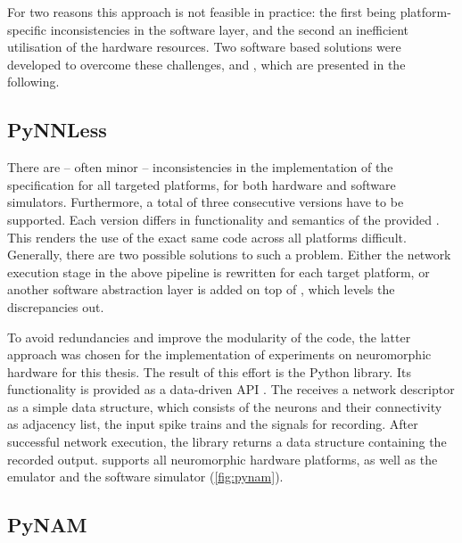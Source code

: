 For two reasons this approach is not feasible in practice: the first being platform-specific inconsistencies in the \PyNN software layer, and the second an inefficient utilisation of the hardware resources. Two software based solutions were developed to overcome these challenges, \PyNNLess and \PyNAM, which are presented in the following.


\subsection{PyNNLess}
\label{sec:pynnless}

There are -- often minor -- inconsistencies in the implementation of the \PyNN specification for all targeted platforms, for both hardware and software simulators. Furthermore, a total of three consecutive \PyNN versions have to be supported. Each version differs in functionality and semantics
of the provided \API. This renders the use of the exact same code across all platforms difficult. Generally, there are two possible solutions to such a problem. Either the network execution stage in the above pipeline is rewritten for each target platform, or another software abstraction layer is added on top of \PyNN, which levels the discrepancies out.

To avoid redundancies and improve the modularity of the code, the latter approach was chosen for the implementation of experiments on neuromorphic hardware for this thesis. The result of this effort is the \PyNNLess Python library. Its functionality is provided as a data-driven \acrshort{API} \cite{reddy2011api}. The \API receives a network descriptor as a simple data structure, which consists of the neurons and their connectivity as adjacency list, the input spike trains and the signals for recording. After successful network execution, the library returns a data structure containing the recorded output. \PyNNLess supports all \HBP neuromorphic hardware platforms, as well as the \NMPM emulator \ESS and the software simulator \NEST (\cref{fig:pynam}).

\pagebreak


\subsection{PyNAM}
\label{sec:pynam}

